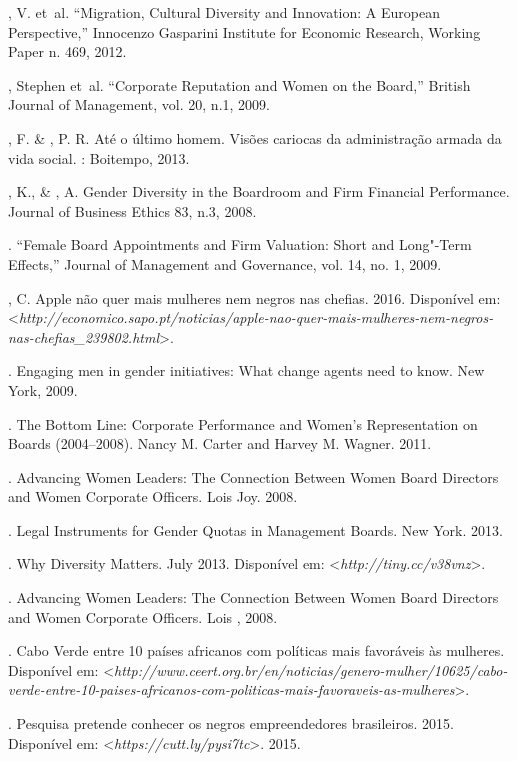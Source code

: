 \begin{bibliohedra}
, V. et~al. ``Migration, Cultural Diversity and Innovation: A
European Perspective,'' Innocenzo Gasparini Institute for Economic
Research, Working Paper n. 469, 2012.

, Stephen et~al. ``Corporate Reputation and Women on the
Board,'' British Journal of Management, vol. 20, n.1, 2009.

, F. \& , P. R. Até o último homem. Visões cariocas da
administração armada da vida social. : Boitempo, 2013.

, K., \& , A. Gender Diversity in the Boardroom and
Firm Financial Performance. Journal of Business Ethics 83, n.3, 2008.

\titidem. ``Female Board Appointments and Firm
Valuation: Short and Long"-Term Effects,'' Journal of Management and
Governance, vol. 14, no. 1, 2009.

, C. Apple não quer mais mulheres nem negros nas chefias. 2016.
Disponível em: \textless{}\emph{http://economico.sapo.pt/noticias/apple-nao-quer-mais-mulheres-nem-negros-nas-chefias\_239802.html}\textgreater{}.

. Engaging men in gender initiatives: What change agents need to
know. New York, 2009.

\titidem. The Bottom Line: Corporate Performance and Women's
Representation on Boards (2004--2008). Nancy M. Carter and Harvey M.
Wagner. 2011.

\titidem. Advancing Women Leaders: The Connection Between Women Board
Directors and Women Corporate Officers. Lois Joy. 2008.

\titidem.  Legal Instruments for Gender Quotas in Management Boards.
New York. 2013.

\titidem. Why Diversity Matters. July 2013.
Disponível em: \textless{}\emph{http://tiny.cc/v38vnz}\textgreater{}.

\titidem. Advancing Women Leaders: The Connection Between Women Board
Directors and Women Corporate Officers. Lois , 2008.

. Cabo Verde entre 10 países africanos com políticas mais
favoráveis às mulheres.
Disponível em: \textless{}\emph{http://www.ceert.org.br/en/noticias/genero-mulher/10625/cabo-verde-entre-10-paises-africanos-com-politicas-mais-favoraveis-as-mulheres}\textgreater{}.

\titidem. Pesquisa pretende conhecer os negros empreendedores
brasileiros. 2015.
Disponível em: \textless{}\emph{https://cutt.ly/pysi7tc}\textgreater{}.
2015.


\end{bibliohedra}
